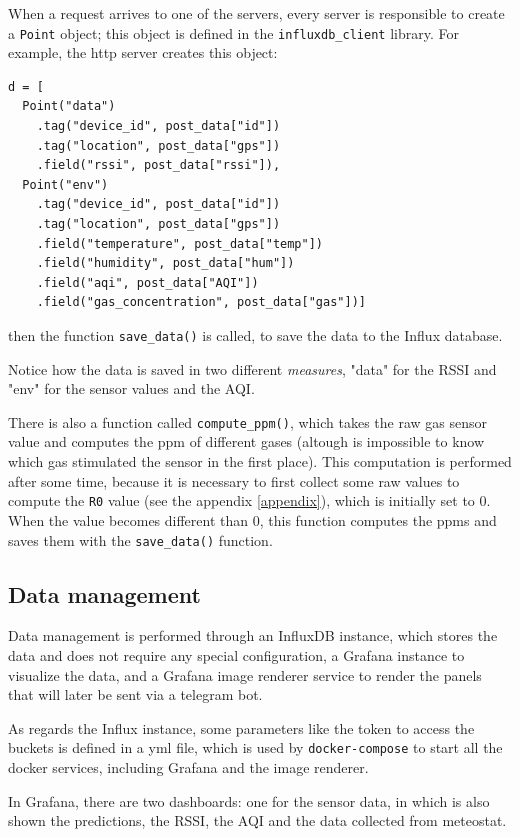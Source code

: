 \documentclass[]{article}
\begin{document}
When a request arrives to one of the servers, every server is responsible to create a \texttt{Point} object; this object is defined in the \texttt{influxdb\_client} library. For example, the http server creates this object:

\begin{lstlisting}[style=Python]
d = [
  Point("data")
    .tag("device_id", post_data["id"])
	.tag("location", post_data["gps"])
	.field("rssi", post_data["rssi"]),
  Point("env")
	.tag("device_id", post_data["id"])
	.tag("location", post_data["gps"])
	.field("temperature", post_data["temp"])
	.field("humidity", post_data["hum"])
	.field("aqi", post_data["AQI"])
	.field("gas_concentration", post_data["gas"])]
\end{lstlisting}

then the function \texttt{save\_data()} is called, to save the data to the Influx database. 

Notice how the data is saved in two different \textit{measures}, "data" for the RSSI and "env" for the sensor values and the AQI. 

There is also a function called \texttt{compute\_ppm()}, which takes the raw gas sensor value and computes the ppm of different gases (altough is impossible to know which gas stimulated the sensor in the first place). This computation is performed after some time, because it is necessary to first collect some raw values to compute the \texttt{R0} value (see the appendix \ref{appendix}), which is initially set to 0. When the value becomes different than 0, this function computes the ppms and saves them with the \texttt{save\_data()} function. 

\subsection{Data management}

Data management is performed through an InfluxDB instance, which stores the data and does not require any special configuration, a Grafana instance to visualize the data, and a Grafana image renderer service to render the panels that will later be sent via a telegram bot. 

As regards the Influx instance, some parameters like the token to access the buckets is defined in a yml file, which is used by \texttt{docker-compose} to start all the docker services, including Grafana and the image renderer.

In Grafana, there are two dashboards: one for the sensor data, in which is also shown the predictions, the RSSI, the AQI and the data collected from meteostat.
\end{document}
